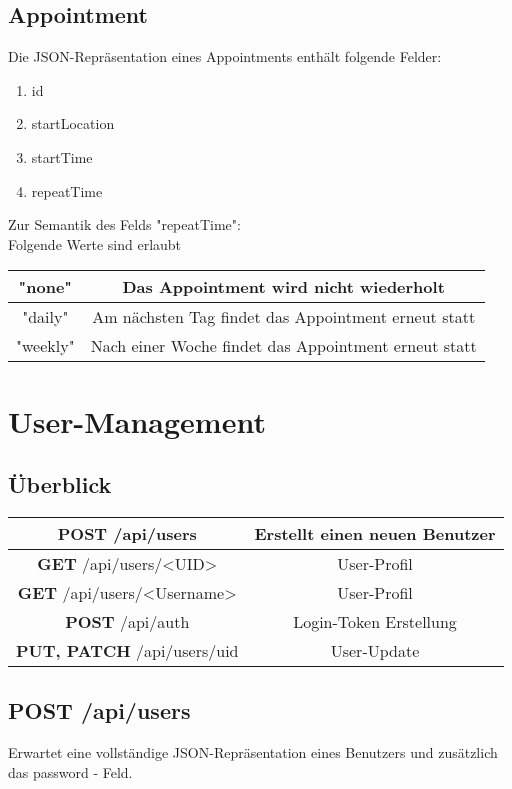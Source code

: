 \documentclass[11pt,a4paper]{article}
\begin{document}
\subsection{Appointment}
Die JSON-Repräsentation eines Appointments enthält folgende Felder:
\begin{enumerate}
    \item id
    \item startLocation
    \item startTime
    \item repeatTime
\end{enumerate}
Zur Semantik des Felds "repeatTime":\\
Folgende Werte sind erlaubt\\

\begin{tabular}{|c|c|}
    \hline
    "none" & Das Appointment wird nicht wiederholt\\
    \hline
    "daily" & Am nächsten Tag findet das Appointment erneut statt\\
    \hline
    "weekly" & Nach einer Woche findet das Appointment erneut statt\\
    \hline
\end{tabular}


\section{User-Management}
\subsection{Überblick}
\begin{tabular}{|c|c|}
\hline
\textbf{POST} /api/users & Erstellt einen neuen Benutzer \\
\hline
\textbf{GET} /api/users/<UID> & User-Profil \\
\hline
\textbf{GET} /api/users/<Username> & User-Profil \\
\hline
\textbf{POST} /api/auth & Login-Token Erstellung \\
\hline
\textbf{PUT, PATCH} /api/users/uid & User-Update \\
\hline
\end{tabular}
\subsection{\textbf{POST} /api/users}
Erwartet eine vollständige JSON-Repräsentation eines Benutzers und zusätzlich das password - Feld.
\end{document}
